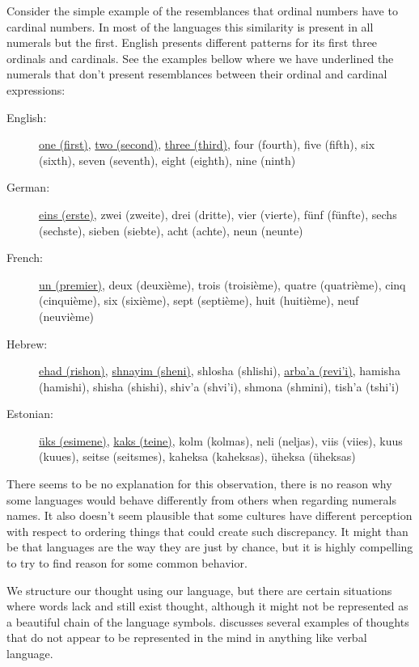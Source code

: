 Consider the simple example of the resemblances that ordinal numbers have to cardinal numbers. 
In most of the languages 
this similarity is present in all numerals but the first. 
English presents different patterns for its first three ordinals and cardinals.
See the examples bellow where we have underlined the
numerals that don't present resemblances between their ordinal and cardinal expressions:
\begin{description}
\item[English:] \underline{one (first)}, \underline{two (second)}, \underline{three (third)}, four (fourth), five (fifth), six (sixth), seven (seventh), eight (eighth), nine (ninth)
\item[German:] \underline{eins (erste)}, zwei (zweite), drei (dritte), vier (vierte), fünf (fünfte), sechs (sechste), sieben (siebte), acht (achte), neun (neunte)
\item[French:] \underline{un (premier)}, deux (deuxième), trois (troisième), quatre (quatrième), cinq (cinquième), six (sixième), sept (septième), huit (huitième), neuf (neuvième)
\item[Hebrew:] \underline{ehad (rishon)}, \underline{shnayim (sheni)}, shlosha (shlishi), \underline{arba'a (revi'i)}, hamisha (hamishi), shisha (shishi), shiv'a (shvi'i), shmona (shmini), tish'a (tshi'i)
\item[Estonian:] \underline{üks (esimene)}, \underline{kaks (teine)}, kolm (kolmas), neli (neljas), viis (viies), kuus (kuues), seitse (seitsmes), kaheksa (kaheksas), üheksa (üheksas)
\end{description}
 There seems to be no explanation for this observation, there is no reason why some languages would behave differently from
 others when regarding numerals names. It also doesn't seem plausible that some cultures have different perception
 with respect to ordering things that could create such discrepancy. It might than be that languages are the way they
 are just by chance, but it is highly compelling to try to find reason for some common behavior.





We structure our thought using our language, but there are certain situations where words lack and still
exist thought, although it might not be represented as a beautiful chain of the language symbols.
\citep{pinker2003} discusses several examples of thoughts that do not appear to be represented in the mind in
anything like verbal language. 


